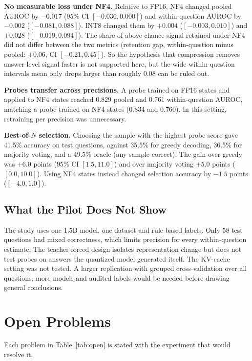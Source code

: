 \documentclass[conference]{IEEEtran}
\begin{document}
\textbf{No measurable loss under NF4.} Relative to FP16, NF4 changed pooled AUROC by $-0.017$ (95\% CI $[-0.036, 0.000]$) and within-question AUROC by $-0.002$ ($[-0.081, 0.088]$). INT8 changed them by $+0.004$ ($[-0.003, 0.010]$) and $+0.028$ ($[-0.019, 0.094]$). The share of above-chance signal retained under NF4 did not differ between the two metrics (retention gap, within-question minus pooled: $+0.06$, CI $[-0.21, 0.45]$). So the hypothesis that compression removes answer-level signal faster is not supported here, but the wide within-question intervals mean only drops larger than roughly 0.08 can be ruled out.

\textbf{Probes transfer across precisions.} A probe trained on FP16 states and applied to NF4 states reached 0.829 pooled and 0.761 within-question AUROC, matching a probe trained on NF4 states (0.834 and 0.760). In this setting, retraining per precision was unnecessary.

\textbf{Best-of-$N$ selection.} Choosing the sample with the highest probe score gave 41.5\% accuracy on test questions, against 35.5\% for greedy decoding, 36.5\% for majority voting, and a 49.5\% oracle (any sample correct). The gain over greedy was $+6.0$ points (95\% CI $[1.5, 11.0]$) and over majority voting $+5.0$ points ($[0.0, 10.0]$). Using NF4 states instead changed selection accuracy by $-1.5$ points ($[-4.0, 1.0]$).

\subsection{What the Pilot Does Not Show}
The study uses one 1.5B model, one dataset and rule-based labels. Only 58 test questions had mixed correctness, which limits precision for every within-question estimate. The teacher-forced design isolates representation change but does not test probes on answers the quantized model generated itself. The KV-cache setting was not tested. A larger replication with grouped cross-validation over all questions, more models and audited labels would be needed before drawing general conclusions.

\section{Open Problems}
\label{sec:open}

Each problem in Table~\ref{tab:open} is stated with the experiment that would resolve it.
\end{document}
